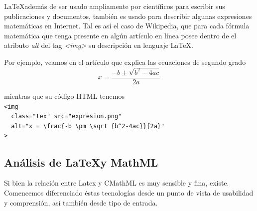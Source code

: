 \LaTeX además de ser usado ampliamente por científicos para escribir sus publicaciones y documentos, también es usado para describir
algunas expresiones matemáticas en Internet. Tal es así el caso de Wikipedia, que para cada fórmula matemática que tenga presente en algún artículo en línea posee dentro de el atributo \textit{alt} del tag \textit{<img>}
su descripción en lenguaje \LaTeX.

Por ejemplo, veamos en el artículo que explica las ecuaciones de segundo grado %
$$x = \frac{-b \pm \sqrt {b^2-4ac}}{2a}$$

mientras que su código HTML tenemos
\\
\verb|<img|\\
\verb|  class="tex" src="expresion.png"|\\
\verb|  alt="x = \frac{-b \pm \sqrt {b^2-4ac}}{2a}"|\\
\verb|>|

\subsection{Análisis de \LaTeX y MathML}

Si bien la relación entre Latex y CMathML\cite{5} es muy sensible y fina, existe. Comencemos diferenciado éstas tecnologías desde un punto de vista de usabilidad y comprensión, así también desde tipo de entrada.


